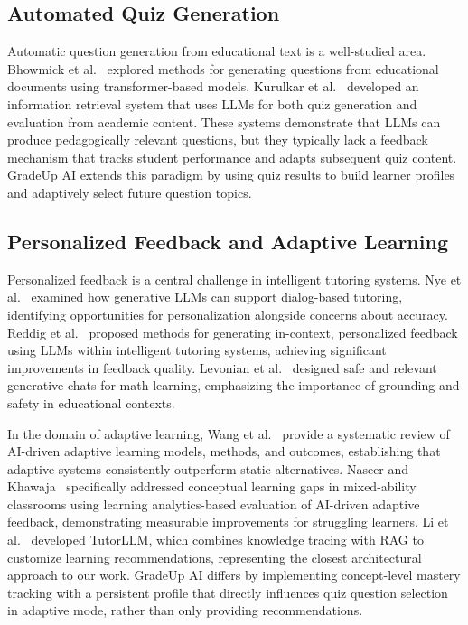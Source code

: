 \documentclass[runningheads]{llncs}
\begin{document}
\subsection{Automated Quiz Generation}

Automatic question generation from educational text is a well-studied area. Bhowmick et al.~\cite{bhowmick2023qg} explored methods for generating questions from educational documents using transformer-based models. Kurulkar et al.~\cite{kurulkar2025quizrag} developed an information retrieval system that uses LLMs for both quiz generation and evaluation from academic content. These systems demonstrate that LLMs can produce pedagogically relevant questions, but they typically lack a feedback mechanism that tracks student performance and adapts subsequent quiz content. GradeUp AI extends this paradigm by using quiz results to build learner profiles and adaptively select future question topics.

\subsection{Personalized Feedback and Adaptive Learning}

Personalized feedback is a central challenge in intelligent tutoring systems. Nye et al.~\cite{nye2023dialog} examined how generative LLMs can support dialog-based tutoring, identifying opportunities for personalization alongside concerns about accuracy. Reddig et al.~\cite{reddig2025feedback} proposed methods for generating in-context, personalized feedback using LLMs within intelligent tutoring systems, achieving significant improvements in feedback quality. Levonian et al.~\cite{levonian2025safechat} designed safe and relevant generative chats for math learning, emphasizing the importance of grounding and safety in educational contexts.

In the domain of adaptive learning, Wang et al.~\cite{wang2024adaptive} provide a systematic review of AI-driven adaptive learning models, methods, and outcomes, establishing that adaptive systems consistently outperform static alternatives. Naseer and Khawaja~\cite{naseer2025adaptive} specifically addressed conceptual learning gaps in mixed-ability classrooms using learning analytics-based evaluation of AI-driven adaptive feedback, demonstrating measurable improvements for struggling learners. Li et al.~\cite{li2025tutorllm} developed TutorLLM, which combines knowledge tracing with RAG to customize learning recommendations, representing the closest architectural approach to our work. GradeUp AI differs by implementing concept-level mastery tracking with a persistent profile that directly influences quiz question selection in adaptive mode, rather than only providing recommendations.
\end{document}

